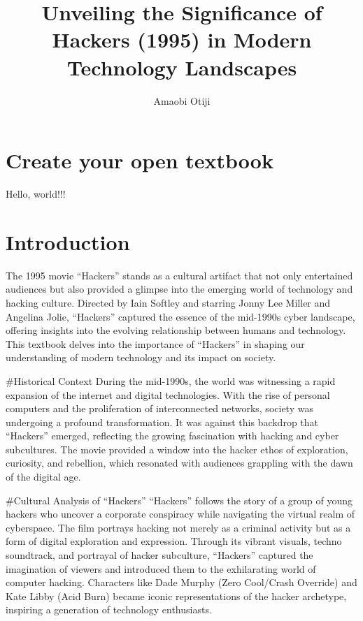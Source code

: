\documentclass[
  openany]{book}
\title{Unveiling the Significance of Hackers (1995) in Modern Technology Landscapes}
\author{Amaobi Otiji}
\date{}
\begin{document}
\maketitle

{
\setcounter{tocdepth}{1}
\tableofcontents
}
\hypertarget{create-your-open-textbook}{%
\chapter{Create your open textbook}\label{create-your-open-textbook}}

Hello, world!!!

\hypertarget{introduction}{%
\chapter{Introduction}\label{introduction}}

The 1995 movie ``Hackers'' stands as a cultural artifact that not only entertained audiences but also provided a glimpse into the emerging world of technology and hacking culture. Directed by Iain Softley and starring Jonny Lee Miller and Angelina Jolie, ``Hackers'' captured the essence of the mid-1990s cyber landscape, offering insights into the evolving relationship between humans and technology. This textbook delves into the importance of ``Hackers'' in shaping our understanding of modern technology and its impact on society.

\#Historical Context
During the mid-1990s, the world was witnessing a rapid expansion of the internet and digital technologies. With the rise of personal computers and the proliferation of interconnected networks, society was undergoing a profound transformation. It was against this backdrop that ``Hackers'' emerged, reflecting the growing fascination with hacking and cyber subcultures. The movie provided a window into the hacker ethos of exploration, curiosity, and rebellion, which resonated with audiences grappling with the dawn of the digital age.

\#Cultural Analysis of ``Hackers''
``Hackers'' follows the story of a group of young hackers who uncover a corporate conspiracy while navigating the virtual realm of cyberspace. The film portrays hacking not merely as a criminal activity but as a form of digital exploration and expression. Through its vibrant visuals, techno soundtrack, and portrayal of hacker subculture, ``Hackers'' captured the imagination of viewers and introduced them to the exhilarating world of computer hacking. Characters like Dade Murphy (Zero Cool/Crash Override) and Kate Libby (Acid Burn) became iconic representations of the hacker archetype, inspiring a generation of technology enthusiasts.
\end{document}
